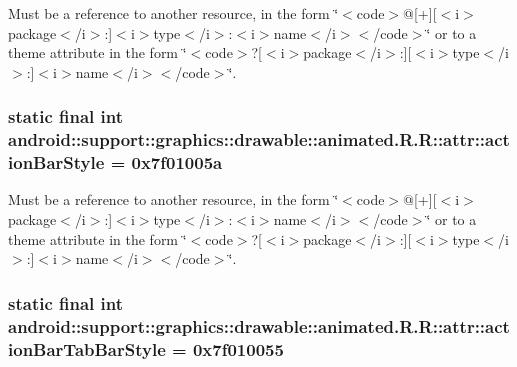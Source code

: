 Must be a reference to another resource, in the form \char`\"{}$<$code$>$@\mbox{[}+\mbox{]}\mbox{[}$<$i$>$package$<$/i$>$:\mbox{]}$<$i$>$type$<$/i$>$:$<$i$>$name$<$/i$>$$<$/code$>$\char`\"{} or to a theme attribute in the form \char`\"{}$<$code$>$?\mbox{[}$<$i$>$package$<$/i$>$:\mbox{]}\mbox{[}$<$i$>$type$<$/i$>$:\mbox{]}$<$i$>$name$<$/i$>$$<$/code$>$\char`\"{}. \hypertarget{classandroid_1_1support_1_1graphics_1_1drawable_1_1animated_1_1_r_1_1attr_a294a62372ae26cb6437013f2f5182d3}{
\subsubsection[{actionBarStyle}]{\setlength{\rightskip}{0pt plus 5cm}static final int android::support::graphics::drawable::animated.R.R::attr::actionBarStyle = 0x7f01005a}}
\label{classandroid_1_1support_1_1graphics_1_1drawable_1_1animated_1_1_r_1_1attr_a294a62372ae26cb6437013f2f5182d3}


Must be a reference to another resource, in the form \char`\"{}$<$code$>$@\mbox{[}+\mbox{]}\mbox{[}$<$i$>$package$<$/i$>$:\mbox{]}$<$i$>$type$<$/i$>$:$<$i$>$name$<$/i$>$$<$/code$>$\char`\"{} or to a theme attribute in the form \char`\"{}$<$code$>$?\mbox{[}$<$i$>$package$<$/i$>$:\mbox{]}\mbox{[}$<$i$>$type$<$/i$>$:\mbox{]}$<$i$>$name$<$/i$>$$<$/code$>$\char`\"{}. \hypertarget{classandroid_1_1support_1_1graphics_1_1drawable_1_1animated_1_1_r_1_1attr_9cb8ca69de0209d8c289db766f936d77}{
\subsubsection[{actionBarTabBarStyle}]{\setlength{\rightskip}{0pt plus 5cm}static final int android::support::graphics::drawable::animated.R.R::attr::actionBarTabBarStyle = 0x7f010055}}
\label{classandroid_1_1support_1_1graphics_1_1drawable_1_1animated_1_1_r_1_1attr_9cb8ca69de0209d8c289db766f936d77}


